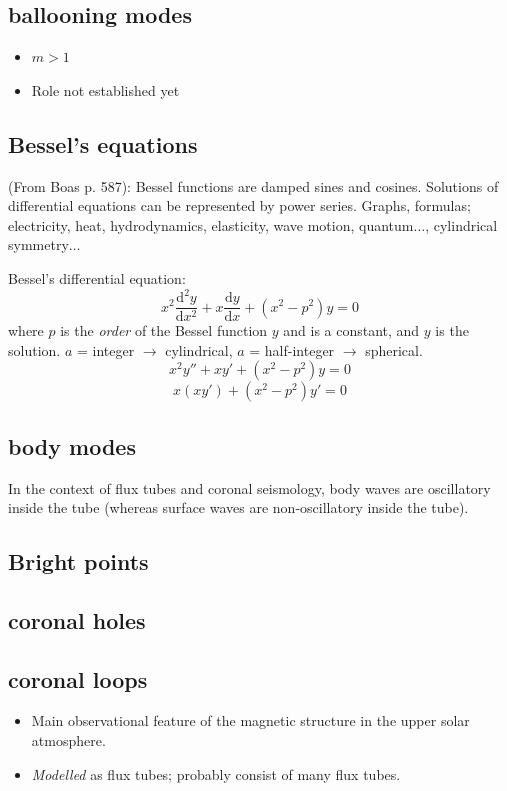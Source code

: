 \documentclass{article}
\begin{document}
\subsection{ballooning modes}
\begin{itemize}
    \item $m > 1$
    \item Role not established yet
\end{itemize}

\subsection{Bessel's equations}

(From Boas p. 587): Bessel functions are damped sines and cosines.
Solutions of differential equations can be represented by power series.
Graphs, formulas; electricity, heat, hydrodynamics, elasticity, wave motion,
quantum$\ldots$, cylindrical symmetry$\ldots$

Bessel's differential equation:
\[
    x^{2}\frac{\mathrm{d}^{2}y}{\mathrm{d}x^{2}} +
    x\frac{\mathrm{d}y}{\mathrm{d}x} +
    \left( x^{2}-p^{2} \right) y
    = 0
    \]
where ${p}$ is the \emph{order} of the Bessel function ${y}$ and is a constant, and
${y}$ is the solution.
${a}$ = integer $\rightarrow$ cylindrical,
${a}$ = half-integer $\rightarrow$ spherical.
\[
    x^{2}y'' + xy' + \left( x^{2}-p^{2} \right) y = 0
    \]
\[
    x\left(xy'\right) + \left(x^{2}-p^{2} \right) y' = 0
    \]

\subsection{body modes}
In the context of flux tubes and coronal seismology,
body waves are oscillatory inside the tube (whereas surface waves are
non-oscillatory inside the tube).

\subsection{Bright points}

\subsection{coronal holes}

\subsection{coronal loops}
\begin{itemize}
    \item Main observational feature of the magnetic structure in the
        upper solar atmosphere.
    \item \emph{Modelled} as flux tubes; probably consist of
        many flux tubes.
\end{itemize}
\end{document}
